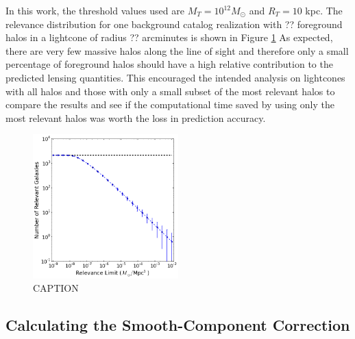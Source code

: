 \documentclass[%
 reprint,
 amsmath,amssymb,
 aps,nofootinbib
]{revtex4-1}
\begin{document}
In this work, the threshold values used are ${M_T=10^{12}M_\odot}$ and ${R_T=10}$ kpc. The relevance distribution for one background catalog realization with ?? foreground halos in a lightcone of radius ?? arcminutes is shown in Figure \ref{fig:rel_dist} As expected, there are very few massive halos along the line of sight and therefore only a small percentage of foreground halos should have a high relative contribution to the predicted lensing quantities. This encouraged the intended analysis on lightcones with all halos and those with only a small subset of the most relevant halos to compare the results and see if the computational time saved by using only the most relevant halos was worth the loss in prediction accuracy.

\begin{figure}
    \centering
    \includegraphics[width=0.5\textwidth]{figs-swe/thesis/relevance_distribution.png}
    \captionsetup{justification=raggedright,singlelinecheck=false}
    \caption{CAPTION}
    \label{fig:rel_dist}
\end{figure}


\subsection{Calculating the Smooth-Component Correction} \label{calc_scc}
\end{document}
